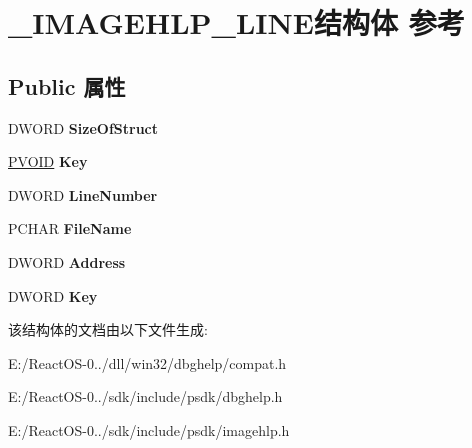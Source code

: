 \hypertarget{struct___i_m_a_g_e_h_l_p___l_i_n_e}{}\section{\+\_\+\+I\+M\+A\+G\+E\+H\+L\+P\+\_\+\+L\+I\+N\+E结构体 参考}
\label{struct___i_m_a_g_e_h_l_p___l_i_n_e}
\subsection*{Public 属性}
\begin{DoxyCompactItemize}
\item 
\mbox{\label{struct___i_m_a_g_e_h_l_p___l_i_n_e_a1c1085bebe3c00cf1cba608acae673a4}} 
D\+W\+O\+RD {\bfseries Size\+Of\+Struct}
\item 
\mbox{\label{struct___i_m_a_g_e_h_l_p___l_i_n_e_ae1e2e701bd416bdb6c48b2b302b9c7fe}} 
\hyperlink{interfacevoid}{P\+V\+O\+ID} {\bfseries Key}
\item 
\mbox{\label{struct___i_m_a_g_e_h_l_p___l_i_n_e_a4960a0351838d186a13b25cf1b306f68}} 
D\+W\+O\+RD {\bfseries Line\+Number}
\item 
\mbox{\label{struct___i_m_a_g_e_h_l_p___l_i_n_e_ae7607dfdee18ee63980cebe13a7781ef}} 
P\+C\+H\+AR {\bfseries File\+Name}
\item 
\mbox{\label{struct___i_m_a_g_e_h_l_p___l_i_n_e_aa75551408f5fd442e28e5bea981ca57b}} 
D\+W\+O\+RD {\bfseries Address}
\item 
\mbox{\label{struct___i_m_a_g_e_h_l_p___l_i_n_e_a102902914997bfee03061a81a1debad4}} 
D\+W\+O\+RD {\bfseries Key}
\end{DoxyCompactItemize}


该结构体的文档由以下文件生成\+:\begin{DoxyCompactItemize}
\item 
E\+:/\+React\+O\+S-\/0../dll/win32/dbghelp/compat.\+h\item 
E\+:/\+React\+O\+S-\/0../sdk/include/psdk/dbghelp.\+h\item 
E\+:/\+React\+O\+S-\/0../sdk/include/psdk/imagehlp.\+h\end{DoxyCompactItemize}
